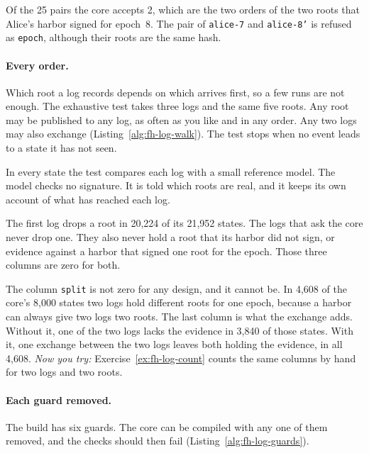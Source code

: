 
Of the 25 pairs the core accepts 2, which are the two orders of the two
roots that Alice's harbor signed for epoch~8. The pair of
\texttt{alice-7} and \texttt{alice-8'} is refused as \texttt{epoch},
although their roots are the same hash.

\paragraph{Every order.}
Which root a log records depends on which arrives first, so a few runs
are not enough. The exhaustive test takes three logs and the same five
roots. Any root may be published to any log, as often as you like and in
any order. Any two logs may also exchange
(Listing~\ref{alg:fh-log-walk}). The test stops when no event leads to a
state it has not seen.

In every state the test compares each log with a small reference model.
The model checks no signature. It is told which roots are real, and it
keeps its own account of what has reached each log.


The first log drops a root in 20,224 of its 21,952 states. The logs that
ask the core never drop one. They also never hold a root that its harbor
did not sign, or evidence against a harbor that signed one root for the
epoch. Those three columns are zero for both.

The column \texttt{split} is not zero for any design, and it cannot be.
In 4,608 of the core's 8,000 states two logs hold different roots for one
epoch, because a harbor can always give two logs two roots. The last column
is what the exchange adds. Without it, one of the two logs lacks the
evidence in 3,840 of those states. With it, one exchange between the two
logs leaves both holding the evidence, in all 4,608. \emph{Now you try:}
Exercise~\ref{ex:fh-log-count} counts the same columns by hand for two
logs and two roots.

\paragraph{Each guard removed.}
The build has six guards. The core can be compiled with any one of them
removed, and the checks should then fail
(Listing~\ref{alg:fh-log-guards}).

